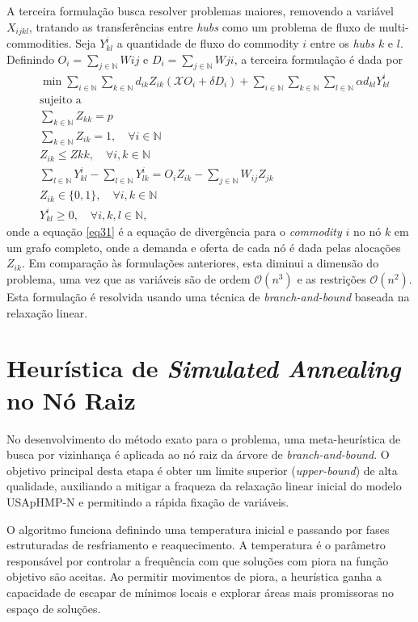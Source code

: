 A terceira formulação busca resolver problemas maiores, removendo a variável $X_{ijkl}$, tratando as transferências entre \textit{hubs} como um problema de fluxo de multi-commodities. Seja $Y_{kl}^i$ a quantidade de fluxo do commodity $i$ entre os \textit{hubs} $k$ e $l$. Definindo $O_i=\sum_{j \in \mathbb{N}}W{ij}$ e $D_i=\sum_{j \in \mathbb{N}}W{ji}$, a terceira formulação é dada por
\begin{align}
    &\min \sum_{i \in \mathbb{N}}\sum_{k \in \mathbb{N}} d_{ik}Z_{ik}(\mathcal{X}O_i+\delta D_i)+\sum_{i \in \mathbb{N}}\sum_{k \in \mathbb{N}}\sum_{l \in \mathbb{N}}\alpha d_{kl}Y_{kl}^i
    \\ &\text{sujeito a} \\ & \sum_{k \in \mathbb{N}}Z_{kk}=p \\ & \sum_{k \in \mathbb{N}} Z_{ik}=1, \quad \forall i \in \mathbb{N} \\ & Z_{ik} \leq Z{kk}, \quad \forall i,k \in \mathbb{N} \\ & \sum_{l \in \mathbb{N}}Y_{kl}^i-\sum_{l \in \mathbb{N}}Y_{lk}^i= O_iZ_{ik}-\sum_{j \in \mathbb{N}}W_{ij}Z_{jk} \label{eq31}\\ & Z_{ik} \in \{0,1\}, \quad \forall i,k \in \mathbb{N} \\ & Y_{kl}^i \geq 0, \quad \forall i,k,l \in \mathbb{N},
\end{align}
onde a equação \ref{eq31} é a equação de divergência para o \textit{commodity} $i$ no nó $k$ em um grafo completo, onde a demanda e oferta de cada nó é dada pelas alocações $Z_{ik}$. Em comparação às formulações anteriores, esta diminui a dimensão do problema, uma vez que as variáveis são de ordem $\mathcal{O}(n^3)$ e as restrições $\mathcal{O}(n^2)$. Esta formulação é resolvida usando uma técnica de \textit{branch-and-bound} baseada na relaxação linear.

\section{Heurística de \textit{Simulated Annealing} no Nó Raiz}

No desenvolvimento do método exato para o problema, uma meta-heurística de busca por vizinhança é aplicada ao nó raiz da árvore de \textit{branch-and-bound}. O objetivo principal desta etapa é obter um limite superior (\textit{upper-bound}) de alta qualidade, auxiliando a mitigar a fraqueza da relaxação linear inicial do modelo USApHMP-N e permitindo a rápida fixação de variáveis.

O algoritmo funciona definindo uma temperatura inicial \cite{white1984} e passando por fases estruturadas de resfriamento e reaquecimento. A temperatura é o parâmetro responsável por controlar a frequência com que soluções com piora na função objetivo são aceitas. Ao permitir movimentos de piora, a heurística ganha a capacidade de escapar de mínimos locais e explorar áreas mais promissoras no espaço de soluções.

